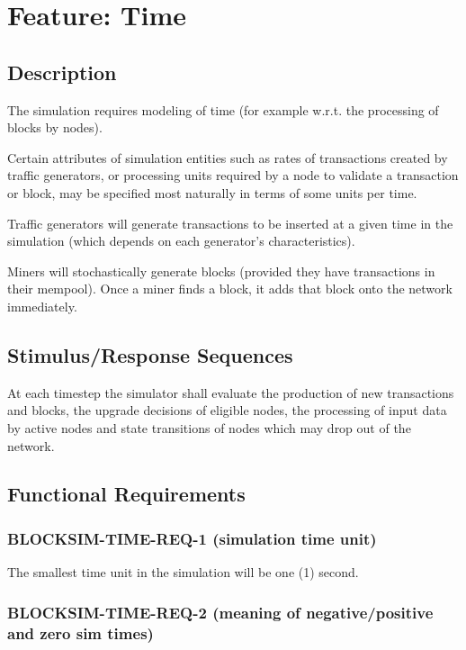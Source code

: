 \documentclass{scrreprt}
\begin{document}
\section{Feature: Time}

\subsection{Description}

The simulation requires modeling of time (for example w.r.t. the
processing of blocks by nodes).

Certain attributes of simulation entities such as rates of transactions
created by traffic generators, or processing units required by a node
to validate a transaction or block, may be specified most naturally in terms
of some units per time.

Traffic generators will generate transactions to be inserted at a given time
in the simulation (which depends on each generator's characteristics).

Miners will stochastically generate blocks (provided they have transactions
in their mempool). Once a miner finds a block, it adds that block onto
the network immediately.


\subsection{Stimulus/Response Sequences}

At each timestep the simulator shall evaluate the production of new
transactions and blocks, the upgrade decisions of eligible nodes,
the processing of input data by active nodes and state transitions
of nodes which may drop out of the network.


\subsection{Functional Requirements}


\subsubsection{BLOCKSIM-TIME-REQ-1 (simulation time unit)}

The smallest time unit in the simulation will be one (1) second.

\subsubsection{BLOCKSIM-TIME-REQ-2 (meaning of negative/positive and zero sim times)}
\end{document}
